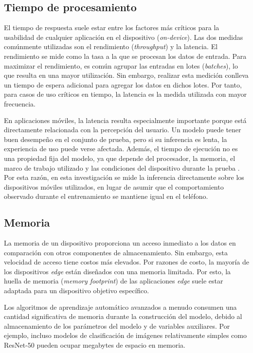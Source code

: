 \subsection{Tiempo de procesamiento}
El tiempo de respuesta suele estar entre los factores más críticos para la usabilidad de cualquier aplicación en el dispositivo
(\textit{on-device}). Las dos medidas comúnmente utilizadas son el rendimiento (\textit{throughput}) y la latencia. El rendimiento se
mide como la tasa a la que se procesan los datos de entrada. Para maximizar el rendimiento, es común agrupar las entradas en lotes
(\textit{batches}), lo que resulta en una mayor utilización.
Sin embargo, realizar esta medición conlleva un tiempo de espera adicional para agregar los datos en dichos lotes. 
Por tanto, para casos de uso críticos en tiempo, la latencia es la medida utilizada con mayor frecuencia.

En aplicaciones móviles, la latencia resulta especialmente importante porque está directamente relacionada con la percepción del usuario.
Un modelo puede tener buen desempeño en el conjunto de prueba, pero si su inferencia es lenta, la experiencia de uso puede verse afectada.
Además, el tiempo de ejecución no es una propiedad fija del modelo, ya que depende del procesador, la memoria, el marco de trabajo utilizado y
las condiciones del dispositivo durante la prueba \cite{zhao2022survey}. Por esta razón, en esta investigación se mide la inferencia
directamente sobre los dispositivos móviles utilizados, en lugar de asumir que el comportamiento observado durante el entrenamiento se
mantiene igual en el teléfono.

\subsection{Memoria}
La memoria de un dispositivo proporciona un acceso inmediato a los datos en comparación con otros componentes de almacenamiento. 
Sin embargo, esta velocidad de acceso tiene costos más elevados. Por razones de costo, la mayoría de los dispositivos \textit{edge} están diseñados con una memoria 
limitada. Por esto, la huella de memoria (\textit{memory footprint}) de las aplicaciones \textit{edge} suele estar adaptada para un dispositivo objetivo específico.

Los algoritmos de aprendizaje automático avanzados a menudo consumen una cantidad significativa de memoria durante la construcción del modelo,
debido al almacenamiento de los parámetros del modelo y de variables auxiliares. Por ejemplo, incluso modelos de clasificación de imágenes relativamente 
simples como ResNet-50 pueden ocupar megabytes de espacio en memoria.


